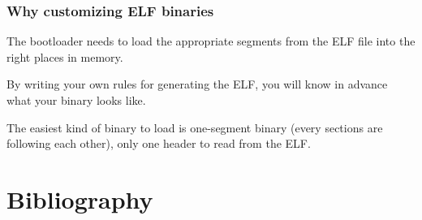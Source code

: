 
\begin{frame}
  \frametitle{Why customizing ELF binaries}

  The bootloader needs to load the appropriate segments from the ELF
  file into the right places in memory.

  \-

  By writing your own rules for generating the ELF, you will know in
  advance what your binary looks like.

  \-

  The easiest kind of binary to load is one-segment binary (every
  sections are following each other), only one header to read from the
  ELF.

\end{frame}

%
%
%

%
%

\section{Bibliography}

\begin{thebibliography}{4}


\end{thebibliography}
